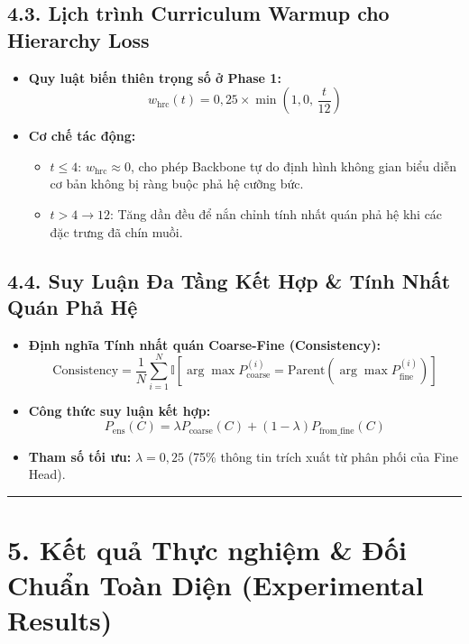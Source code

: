 \documentclass[
  10pt,
  a4paper,
  twocolumn]{article}
\providecommand{\tightlist}{%
  \setlength{\itemsep}{0pt}\setlength{\parskip}{0pt}}
\begin{document}
\subsection{4.3. Lịch trình Curriculum Warmup cho Hierarchy
Loss}\label{lux1ecbch-truxecnh-curriculum-warmup-cho-hierarchy-loss}

\begin{itemize}
\tightlist
\item
  \textbf{Quy luật biến thiên trọng số ở Phase 1:}
  \[w_{\text{hrc}}(t) = 0{,}25 \times \min\left(1{,}0,\, \frac{t}{12}\right)\]
\item
  \textbf{Cơ chế tác động:}

  \begin{itemize}
  \tightlist
  \item
    \(t \le 4\): \(w_{\text{hrc}} \approx 0\), cho phép Backbone tự do
    định hình không gian biểu diễn cơ bản không bị ràng buộc phả hệ
    cưỡng bức.
  \item
    \(t > 4 \rightarrow 12\): Tăng dần đều để nắn chỉnh tính nhất quán
    phả hệ khi các đặc trưng đã chín muồi.
  \end{itemize}
\end{itemize}

\subsection{4.4. Suy Luận Đa Tầng Kết Hợp \& Tính Nhất Quán Phả
Hệ}\label{suy-luux1eadn-ux111a-tux1ea7ng-kux1ebft-hux1ee3p-tuxednh-nhux1ea5t-quuxe1n-phux1ea3-hux1ec7}

\begin{itemize}
\tightlist
\item
  \textbf{Định nghĩa Tính nhất quán Coarse-Fine (Consistency):}
  \[\text{Consistency} = \frac{1}{N}\sum_{i=1}^N \mathbb{I}\left[\arg\max P_{\text{coarse}}^{(i)} = \text{Parent}\left(\arg\max P_{\text{fine}}^{(i)}\right)\right]\]
\item
  \textbf{Công thức suy luận kết hợp:}
  \[P_{\text{ens}}(C) = \lambda P_{\text{coarse}}(C) + (1-\lambda) P_{\text{from\_fine}}(C)\]
\item
  \textbf{Tham số tối ưu:} \(\lambda = 0{,}25\) (75\% thông tin trích
  xuất từ phân phối của Fine Head).
\end{itemize}

\begin{center}\rule{0.5\linewidth}{0.5pt}\end{center}

\section{5. Kết quả Thực nghiệm \& Đối Chuẩn Toàn Diện (Experimental
Results)}\label{kux1ebft-quux1ea3-thux1ef1c-nghiux1ec7m-ux111ux1ed1i-chuux1ea9n-touxe0n-diux1ec7n-experimental-results}
\end{document}
